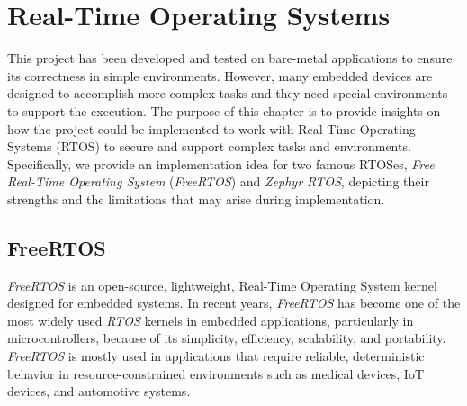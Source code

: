 \chapter{Real-Time Operating Systems}
\label{cha:rtos}

This project has been developed and tested on bare-metal applications to ensure
its correctness in simple environments. However, many embedded devices are
designed to accomplish more complex tasks and they need special environments to
support the execution. The purpose of this chapter is to provide insights on how
the project could be implemented to work with Real-Time Operating Systems (RTOS)
to secure and support complex tasks and environments. Specifically, we provide an
implementation idea for two famous RTOSes, \textit{Free Real-Time Operating
System} (\textit{FreeRTOS}) and \textit{Zephyr RTOS}, depicting their strengths
and the limitations that may arise during implementation.

\section{FreeRTOS}
\label{sec:rtos_rtos}

\textit{FreeRTOS}\cite{freertos} is an open-source, lightweight, Real-Time Operating
System kernel designed for embedded systems. In recent years, \textit{FreeRTOS}
has become one of the most widely used \textit{RTOS} kernels in embedded applications,
particularly in microcontrollers, because of its simplicity, efficiency, scalability,
and portability. \textit{FreeRTOS} is mostly used in applications that require
reliable, deterministic behavior in resource-constrained environments such as medical
devices, IoT devices, and automotive systems.


